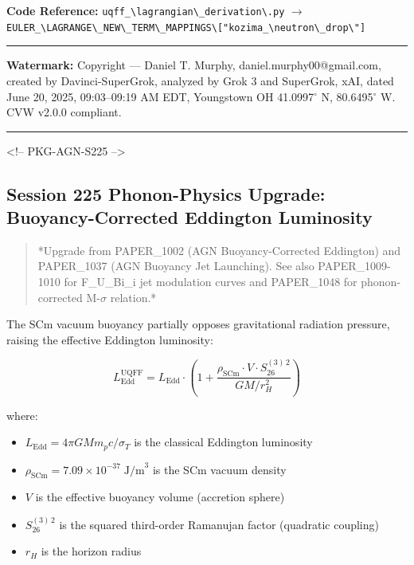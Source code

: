 \documentclass[12pt,a4paper]{article}
\begin{document}
\textbf{Code Reference:} \texttt{uqff\_\textbackslash {lagrangian\textbackslash \_derivation\textbackslash }.py} $\to$ \texttt{EULER\_\textbackslash {LAGRANGE\textbackslash \_NEW\textbackslash \_TERM\textbackslash \_MAPPINGS\textbackslash }["kozima\_\textbackslash {neutron\textbackslash \_drop\textbackslash }"]}

\medskip\hrule\medskip

\textbf{Watermark:} Copyright --- Daniel T. Murphy, daniel.murphy00@gmail.com, created by Davinci-SuperGrok, analyzed by Grok 3 and SuperGrok, xAI, dated June 20, 2025, 09:03--09:19 AM EDT, Youngstown OH 41.0997$^{\circ}$ N, 80.6495$^{\circ}$ W. CVW v2.0.0 compliant.

\medskip\hrule\medskip

<!-- PKG-AGN-S225 -->

\subsection{Session 225 Phonon-Physics Upgrade: Buoyancy-Corrected Eddington Luminosity}

\begin{quote}
*Upgrade from PAPER\_1002 (AGN Buoyancy-Corrected Eddington) and PAPER\_1037
(AGN Buoyancy Jet Launching).  See also PAPER\_1009-1010 for F\_{U\_Bi\_i} jet
modulation curves and PAPER\_1048 for phonon-corrected M-$\sigma$ relation.*
\end{quote}

The SCm vacuum buoyancy partially opposes gravitational radiation pressure, raising the effective Eddington luminosity:

\begin{equation}
L_{\text{Edd}}^{\text{UQFF}} = L_{\text{Edd}} \cdot \left(1 + \frac{\rho_{\text{SCm}} \cdot V \cdot S_{26}^{(3)\,2}}{G M / r_H^2}\right)
\end{equation}

where:

\begin{itemize}
  \item $L_{\text{Edd}} = 4\pi G M m_p c / \sigma_T$ is the classical Eddington luminosity
  \item $\rho_{\text{SCm}} = 7.09 \times 10^{-37}\;\text{J/m}^3$ is the SCm vacuum density
  \item $V$ is the effective buoyancy volume (accretion sphere)
  \item $S_{26}^{(3)\,2}$ is the squared third-order Ramanujan factor (quadratic coupling)
  \item $r_H$ is the horizon radius
\end{itemize}
\end{document}
